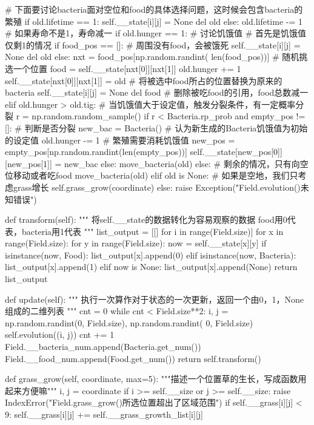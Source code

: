 \documentclass[a4paper]{ctexart}
\begin{document}
\begin{python}
				# 下面要讨论bacteria面对空位和food的具体选择问题，这时候会包含bacteria的繁殖
				if old.lifetime == 1:
					self.__state[i][j] = None
					del old
				else:
					old.lifetime -= 1  # 如果寿命不是1，寿命减一
					if old.hunger == 1:  # 讨论饥饿值
						# 首先是饥饿值仅剩1的情况
						if food_pos == []:  # 周围没有food，会被饿死
							self.__state[i][j] = None
							del old
						else:
							nxt = food_pos[np.random.randint(
								len(food_pos))]  # 随机挑选一个位置
							food = self.__state[nxt[0]][nxt[1]]
							old.hunger += 1
							self.__state[nxt[0]][nxt[1]] = old
							# 将被选中food所占的位置替换为原来的bacteria
							self.__state[i][j] = None
							del food  # 删除被吃food的引用，food总数减一
					elif old.hunger > old.tig:
						# 当饥饿值大于设定值，触发分裂条件，有一定概率分裂
						r = np.random.random_sample()
						if r < Bacteria.rp_prob and empty_pos != []:  # 判断是否分裂
							new_bac = Bacteria()  # 认为新生成的Bacteria饥饿值为初始的设定值
							old.hunger -= 1  # 繁殖需要消耗饥饿值
							new_pos = empty_pos[np.random.randint(len(empty_pos))]
							self.__state[new_pos[0]][new_pos[1]] = new_bac
						else:
							move_bacteria(old)
					else:
						# 剩余的情况，只有向空位移动或者吃food
						move_bacteria(old)
			elif old is None:
				# 如果是空地，我们只考虑grass增长
				self.grass_grow(coordinate)
			else:
				raise Exception("Field.evolution()未知错误")
	
		def transform(self):
			"""
			将self.__state的数据转化为容易观察的数据
			food用0代表，bacteria用1代表
			"""
			list_output = [[] for i in range(Field.size)]
			for x in range(Field.size):
				for y in range(Field.size):
					now = self.__state[x][y]
					if isinstance(now, Food):
						list_output[x].append(0)
					elif isinstance(now, Bacteria):
						list_output[x].append(1)
					elif now is None:
						list_output[x].append(None)
			return list_output
	
		def update(self):
			"""
			执行一次算作对于状态的一次更新，返回一个由0，1，None组成的二维列表
			"""
			cnt = 0
			while cnt < Field.size**2:
				i, j = np.random.randint(0, Field.size), np.random.randint(
					0, Field.size)
				self.evolution((i, j))
				cnt += 1
			Field.__bacteria_num.append(Bacteria.get_num())
			Field.__food_num.append(Food.get_num())
			return self.transform()
	
		def grass_grow(self, coordinate, max=5):
			"""描述一个位置草的生长，写成函数用起来方便嘛"""
			i, j = coordinate
			if i >= self.__size or j >= self.__size:
				raise IndexError("Field.grass_grow()所选位置超出了区域范围")
			if self.__grass[i][j] < 9:
				self.__grass[i][j] += self.__grass_growth_list[i][j]
	

\end{python}
\end{document}
